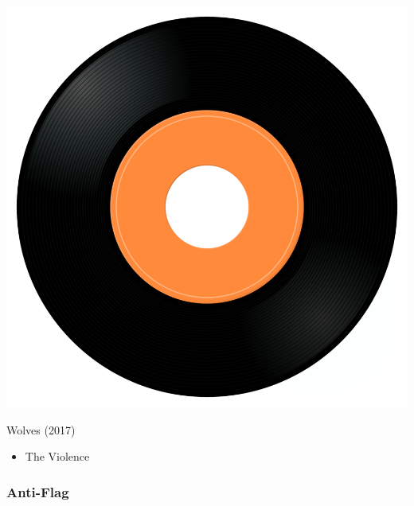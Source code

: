 \begin{minipage}[t]{0.25\textwidth}
\captionsetup{type=figure}
\includegraphics[width=\textwidth]{Images/cover.png}
\caption*{Wolves (2017)}
\end{minipage}
\begin{minipage}[t]{0.25\textwidth}\vspace{0pt}
\begin{itemize}[nosep,leftmargin=1em,labelwidth=*,align=left]
	\setlength{\itemsep}{0pt}
	\item The Violence
\end{itemize}
\end{minipage}

\subsubsection{Anti-Flag}

